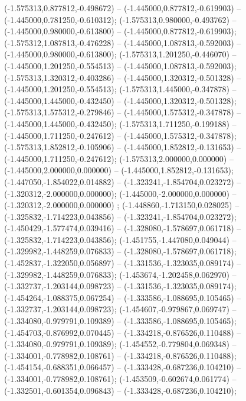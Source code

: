  (-1.575313,0.877812,-0.498672) -- (-1.445000,0.877812,-0.619903) -- (-1.445000,0.781250,-0.610312);
 (-1.575313,0.980000,-0.493762) -- (-1.445000,0.980000,-0.613800) -- (-1.445000,0.877812,-0.619903);
 (-1.575312,1.087813,-0.476228) -- (-1.445000,1.087813,-0.592003) -- (-1.445000,0.980000,-0.613800);
 (-1.575313,1.201250,-0.446070) -- (-1.445000,1.201250,-0.554513) -- (-1.445000,1.087813,-0.592003);
 (-1.575313,1.320312,-0.403286) -- (-1.445000,1.320312,-0.501328) -- (-1.445000,1.201250,-0.554513);
 (-1.575313,1.445000,-0.347878) -- (-1.445000,1.445000,-0.432450) -- (-1.445000,1.320312,-0.501328);
 (-1.575313,1.575312,-0.279846) -- (-1.445000,1.575312,-0.347878) -- (-1.445000,1.445000,-0.432450);
 (-1.575313,1.711250,-0.199188) -- (-1.445000,1.711250,-0.247612) -- (-1.445000,1.575312,-0.347878);
 (-1.575313,1.852812,-0.105906) -- (-1.445000,1.852812,-0.131653) -- (-1.445000,1.711250,-0.247612);
 (-1.575313,2.000000,0.000000) -- (-1.445000,2.000000,0.000000) -- (-1.445000,1.852812,-0.131653);
 (-1.447050,-1.854022,0.014882) -- (-1.323241,-1.854704,0.023272) -- (-1.320312,-2.000000,0.000000);
 (-1.445000,-2.000000,0.000000) -- (-1.320312,-2.000000,0.000000) ;
 (-1.448860,-1.713150,0.028025) -- (-1.325832,-1.714223,0.043856) -- (-1.323241,-1.854704,0.023272);
 (-1.450429,-1.577474,0.039416) -- (-1.328080,-1.578697,0.061718) -- (-1.325832,-1.714223,0.043856);
 (-1.451755,-1.447080,0.049044) -- (-1.329982,-1.448259,0.076833) -- (-1.328080,-1.578697,0.061718);
 (-1.452837,-1.322050,0.056897) -- (-1.331536,-1.323035,0.089174) -- (-1.329982,-1.448259,0.076833);
 (-1.453674,-1.202458,0.062970) -- (-1.332737,-1.203144,0.098723) -- (-1.331536,-1.323035,0.089174);
 (-1.454264,-1.088375,0.067254) -- (-1.333586,-1.088695,0.105465) -- (-1.332737,-1.203144,0.098723);
 (-1.454607,-0.979867,0.069747) -- (-1.334080,-0.979791,0.109389) -- (-1.333586,-1.088695,0.105465);
 (-1.454703,-0.876992,0.070445) -- (-1.334218,-0.876526,0.110488) -- (-1.334080,-0.979791,0.109389);
 (-1.454552,-0.779804,0.069348) -- (-1.334001,-0.778982,0.108761) -- (-1.334218,-0.876526,0.110488);
 (-1.454154,-0.688351,0.066457) -- (-1.333428,-0.687236,0.104210) -- (-1.334001,-0.778982,0.108761);
 (-1.453509,-0.602674,0.061774) -- (-1.332501,-0.601354,0.096843) -- (-1.333428,-0.687236,0.104210);
